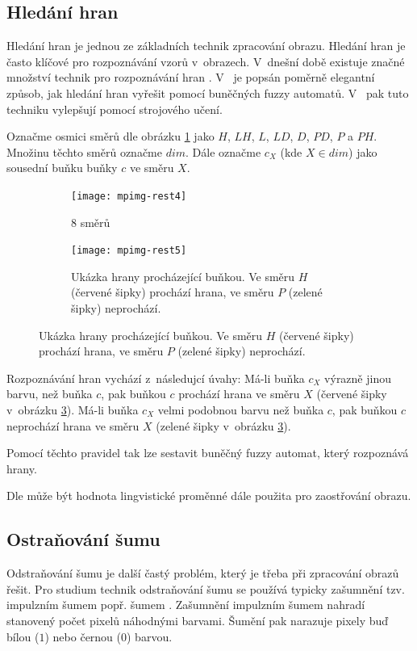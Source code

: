\subsection{Hledání hran}
Hledání hran je jednou ze základních technik zpracování obrazu. Hledání hran je často klíčové pro rozpoznávání vzorů v~obrazech. V~dnešní době existuje značné množství technik pro rozpoznávání hran \cite{MaiAgg-StuComVarImDetEdTec}. V~\cite{MarMeySol-HybMetGasDifModFuzCelAutImSha} je popsán poměrně elegantní způsob, jak hledání hran vyřešit pomocí buněčných fuzzy automatů. V~\cite{PatMor-EdgDetTecFuzzLogCEllLeaAutFuzzImPro} pak tuto techniku vylepšují pomocí strojového učení.

Označme osmici směrů dle obrázku \ref{img:Directions:8Directions} jako $H$, $LH$, $L$, $LD$, $D$, $PD$, $P$ a $PH$. Množinu těchto směrů označme $dim$. Dále označme $c_X$ (kde $X \in dim$) jako sousední buňku buňky $c$ ve směru $X$.

\begin{figure}
   \begin{subfigure}[t]{0.4\textwidth}
      \texttt{[image: mpimg-rest4]}
      \caption{8 směrů}  \label{img:Directions:8Directions}
    \end{subfigure}%
%
    \begin{subfigure}[t]{0.4\textwidth}
      \texttt{[image: mpimg-rest5]}
      \caption{Ukázka hrany procházející buňkou. Ve směru $H$ (červené šipky) prochází hrana, ve směru $P$ (zelené šipky) neprochází.}  \label{img:Directions:Edges}
    \end{subfigure}
\end{figure}

Rozpoznávání hran vychází z~následujcí úvahy: Má-li buňka $c_X$ výrazně jinou barvu, než buňka $c$, pak buňkou $c$ prochází hrana ve směru $X$ (červené šipky v~obrázku \ref{img:Directions:Edges}). Má-li buňka $c_X$ velmi podobnou barvu než buňka $c$, pak buňkou $c$ neprochází hrana ve směru $X$ (zelené šipky v~obrázku \ref{img:Directions:Edges}). 

Pomocí těchto pravidel tak lze sestavit buněčný fuzzy automat, který rozpoznává hrany. 

Dle \cite{MarMeySol-HybMetGasDifModFuzCelAutImSha} může být hodnota lingvistické proměnné  dále použita pro zaostřování obrazu.

\subsection{Ostraňování šumu} \label{subs:NoisRem}
Odstraňování šumu je další častý problém, který je třeba při zpracování obrazů řešit. Pro studium technik odstraňování šumu se používá typicky zašumnění tzv. impulzním šumem popř. šumem . Zašumnění impulzním šumem nahradí stanovený počet pixelů náhodnými barvami. Šumění  pak narazuje pixely buď bílou ($1$) nebo černou ($0$) barvou.

